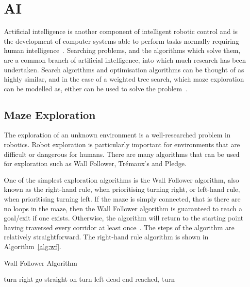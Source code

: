 \section{AI}\label{litreview/maze}
Artificial intelligence is another component of intelligent robotic control and is the
development of computer systems able to perform tasks normally requiring human intelligence~\cite{russell2016artificial}. Searching problems, and the algorithms which solve them, are a
common branch of artificial intelligence, into which much research has been undertaken. Search
algorithms and optimisation algorithms can be thought of as highly similar, and in the case of
a weighted tree search, which maze exploration can be modelled as, either can be used to solve the problem~\cite{kanal2012search}.

\subsection{Maze Exploration}\label{litreview/maze/exploration}
The exploration of an unknown environment is a well-researched problem in
robotics. Robot exploration is particularly important for
environments that are difficult or dangerous for humans. There are many
algorithms that can be used for exploration such as Wall Follower,
Trémaux's and Pledge.

One of the simplest exploration algorithms is the Wall Follower algorithm,
also known as the right-hand rule, when prioritising turning right, or
left-hand rule, when prioritising turning left. If the maze is simply
connected, that is there are no loops in the maze, then the Wall Follower
algorithm is guaranteed to reach a goal/exit if one exists. Otherwise, the
algorithm will return to the starting point having traversed every corridor at
least once~\cite{wallFollowerArcBotics}. The steps of the algorithm are
relatively straightforward. The right-hand rule algorithm is shown in Algorithm~\ref{alg:wf}.

\begin{algorithm}
\caption{Wall Follower Algorithm}\label{alg:wf}
\begin{algorithmic}
\REPEAT
{}
  \STATE turn right
  \STATE go straight on
  \STATE turn left
\ELSE
  \STATE dead end reached, turn
\ENDIF
{}

\end{algorithmic}
\end{algorithm}

